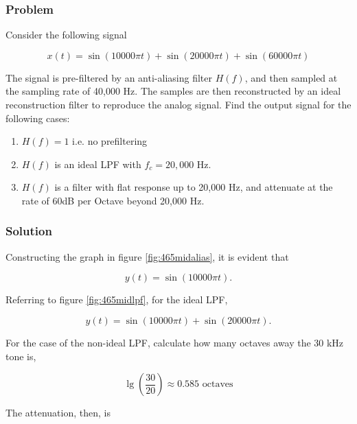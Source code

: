 \subsubsection{Problem}

Consider the following signal

\begin{equation}
    x(t) = \sin \left(10000\pi t \right) + \sin \left(20000\pi t \right) + \sin \left(60000\pi t \right)
\end{equation}

The signal is pre-filtered by an anti-aliasing filter $H(f)$, 
and then sampled at the sampling rate of 40,000 Hz. 
The samples are then reconstructed by an ideal reconstruction filter to 
reproduce the analog signal. Find the output signal for the following cases:

\begin{enumerate}
    \item $H(f) = 1$ i.e. no prefiltering
    \item $H(f)$ is an ideal LPF with $f_c = 20,000$ Hz.
    \item $H(f)$ is a filter with flat response up to 20,000 Hz, and attenuate at the rate of 60dB per Octave beyond 
    20,000 Hz.
\end{enumerate}


\subsubsection{Solution}

Constructing the graph in figure \ref{fig:465midalias}, it is evident that 

\begin{equation}
    y(t) = \sin \left(10000\pi t \right).
\end{equation}

Referring to figure \ref{fig:465midlpf}, for the ideal LPF,

\begin{equation}
    y(t) = \sin \left(10000\pi t \right) + \sin \left(20000\pi t \right).
\end{equation}

For the case of the non-ideal LPF, calculate how many octaves away the 
30 kHz tone is,

\begin{equation}
    \lg \left( {\frac{{30}}{{20}}} \right) \approx 0.585{\text{ octaves}}
\end{equation}

The attenuation, then, is

